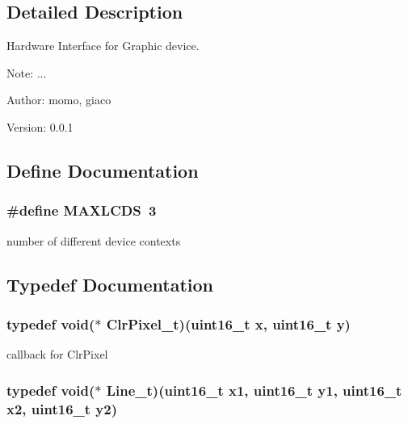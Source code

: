 \subsection{Detailed Description}
Hardware Interface for Graphic device. 

\begin{Desc}
\item[Note:]... \end{Desc}
\begin{Desc}
\item[Author:]momo, giaco \end{Desc}
\begin{Desc}
\item[Version:]0.0.1 \end{Desc}


\subsection{Define Documentation}
\hypertarget{group__graphic__hw__interface_g04bac763718080bfe54d5a7fa58036d2}{
\subsubsection[{MAXLCDS}]{\setlength{\rightskip}{0pt plus 5cm}\#define MAXLCDS~3}}
\label{group__graphic__hw__interface_g04bac763718080bfe54d5a7fa58036d2}


number of different device contexts 

\subsection{Typedef Documentation}
\hypertarget{group__graphic__hw__interface_g6840b9250f097bd4e0cc14ab0b607101}{
\subsubsection[{ClrPixel\_\-t}]{\setlength{\rightskip}{0pt plus 5cm}typedef void($\ast$ {\bf ClrPixel\_\-t})(uint16\_\-t x, uint16\_\-t y)}}
\label{group__graphic__hw__interface_g6840b9250f097bd4e0cc14ab0b607101}


callback for ClrPixel \hypertarget{group__graphic__hw__interface_g91ecaa7e16f781d972a8f96c4cd59492}{
\subsubsection[{Line\_\-t}]{\setlength{\rightskip}{0pt plus 5cm}typedef void($\ast$ {\bf Line\_\-t})(uint16\_\-t x1, uint16\_\-t y1, uint16\_\-t x2, uint16\_\-t y2)}}
\label{group__graphic__hw__interface_g91ecaa7e16f781d972a8f96c4cd59492}


